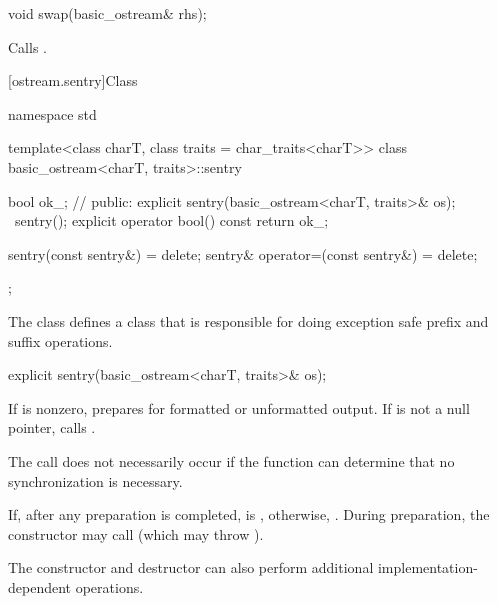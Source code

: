 %
\begin{itemdecl}
void swap(basic_ostream& rhs);
\end{itemdecl}

\begin{itemdescr}
\pnum
\effects
Calls .
\end{itemdescr}

[ostream.sentry]{Class }

%
%
\begin{codeblock}
namespace std {
  template<class charT, class traits = char_traits<charT>>
  class basic_ostream<charT, traits>::sentry {
    bool ok_;       // \expos
  public:
    explicit sentry(basic_ostream<charT, traits>& os);
    ~sentry();
    explicit operator bool() const { return ok_; }

    sentry(const sentry&) = delete;
    sentry& operator=(const sentry&) = delete;
  };
}
\end{codeblock}

\pnum
The class
defines a class that is responsible for doing exception safe prefix and suffix
operations.

%
\begin{itemdecl}
explicit sentry(basic_ostream<charT, traits>& os);
\end{itemdecl}

\begin{itemdescr}
\pnum
If
is nonzero, prepares for formatted or unformatted output.
If
is not a null pointer, calls
%
.%
\begin{footnote}
The call
does not necessarily occur if the function can determine that no
synchronization is necessary.
\end{footnote}

\pnum
If, after any preparation is completed,
is
,
otherwise,
.
During preparation, the constructor may call
(which may throw
).
\begin{footnote}
The
constructor and destructor
can also perform additional
%
implementation-dependent operations.
\end{footnote}
\end{itemdescr}

